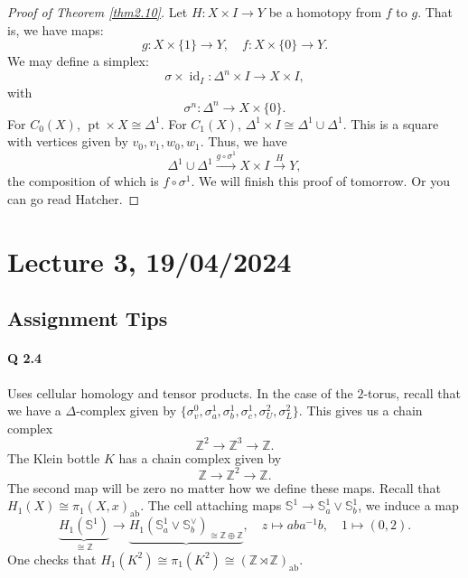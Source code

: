 \documentclass[a4paper]{report}
\theoremstyle{definition}
\theoremstyle{remark}
\theoremstyle{proposition}
\theoremstyle{conjecture}
\theoremstyle{lemma}
\theoremstyle{corollary}
\theoremstyle{exercise}
\newcommand{\on}{\operatorname}
\begin{document}
\begin{proof}[Proof of Theorem \ref{thm2.10}]
    Let $H : X \times I \to Y$ be a homotopy from $f$ to $g$. 
    That is, we have maps: $$g : X \times \lbrace 1 \rbrace \to Y,\quad f : X \times \lbrace 0\rbrace \longrightarrow Y.$$
    We may define a simplex: $$\sigma \times \on{id}_I : \Delta^n \times I \longrightarrow X \times I,$$
    with $$\sigma^n : \Delta^n \longrightarrow X \times \lbrace 0 \rbrace.$$
    For $C_0(X)$, $\on{pt} \times X \cong \Delta^1$. For $C_1(X)$, 
    $\Delta^1 \times I \cong \Delta^1 \cup \Delta^1$. This is a square with vertices 
    given by $v_0, v_1, w_0, w_1$.
    Thus, we have 
    $$\Delta^1 \cup \Delta^1 \stackrel{g\circ \sigma^1}{\longrightarrow} X \times I \stackrel{H}{\longrightarrow} Y,$$
    the composition of which is $f\circ \sigma^1$. We will finish this proof of tomorrow. Or you can go read Hatcher.
\end{proof}

\section{Lecture 3, 19/04/2024}

\subsection{Assignment Tips}

\paragraph{Q 2.4} Uses cellular homology and tensor products. In the case of the $2$-torus, 
recall that we have a $\Delta$-complex given by 
$\lbrace \sigma_v^0, \sigma_a^1, \sigma_b^1, \sigma_c^1, \sigma_U^2, \sigma_L^2\rbrace$.
This gives us a chain complex $$\mathbb{Z}^2 \longrightarrow \mathbb{Z}^3 \longrightarrow \mathbb{Z}.$$
The Klein bottle $K$ has a chain complex given by 
$$\mathbb{Z} \longrightarrow \mathbb{Z}^2 \longrightarrow \mathbb{Z}.$$ 
The second map will be zero no matter how we define these maps.
Recall that $H_1(X) \cong \pi_1(X,x)_{\on{ab}}$. The cell attaching maps 
$\mathbb{S}^1 \to \mathbb{S}^1_a \vee \mathbb{S}^1_b$, we induce a map 
$$\underbrace{H_1(\mathbb{S}^1)}_{\cong \mathbb{Z}} \longrightarrow \underbrace{H_1(\mathbb{S}_a^1 \vee \mathbb{S}_b^\vee)_{\cong \mathbb{Z} \oplus \mathbb{Z}}}, \quad z \longmapsto aba^{-1}b, \quad 1 \longmapsto (0,2).$$
One checks that $H_1(K^2) \cong \pi_1(K^2) \cong (\mathbb{Z} \rtimes \mathbb{Z})_{\on{ab}}$.
\end{document}

